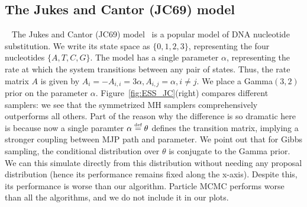   \subsection{The Jukes and Cantor (JC69) model}~
  The Jukes and Cantor (JC69) model~\citep{jukescantor69} is a popular model of DNA nucleotide substitution.  
  We write its state space as $\{0, 1, 2, 3\}$, representing the four nucleotides $\{A, T, C, G\}$.  
  The model has a single parameter $\alpha$, representing the rate at which the system transitions between any pair of states. 
  Thus, the rate matrix $A$ is given by $A_i = -A_{i,i} = 3\alpha, A_{i, j} = \alpha,i \neq j.$
We place a Gamma$(3,2)$ prior on the parameter $\alpha$.
Figure~\ref{fig:ESS_JC}(right) compares different samplers: we see that the symmetrized MH samplers comprehensively outperforms all others.
Part of the reason why the difference is so dramatic here is because now a single paramter $\alpha \defeq \theta$ defines the transition matrix, implying a stronger coupling between MJP path and parameter. 
We point out that for Gibbs sampling, the conditional distribution over $\theta$ is conjugate to the Gamma prior. We can this simulate directly from this distribution without needing any proposal distribution (hence its performance remains fixed along the x-axis). Despite this, its performance is worse than our algorithm.
Particle MCMC performs worse than all the algorithms, and we do not include it in our plots.

